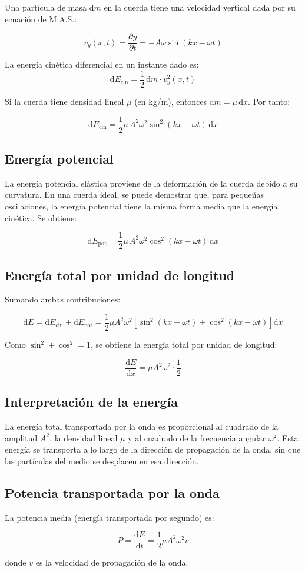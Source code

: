 Una partícula de masa \(\mathrm{d}m\) en la cuerda tiene una velocidad vertical dada por su ecuación de M.A.S.:

\[
v_y(x,t) = \frac{\partial y}{\partial t} = -A \omega \sin(kx - \omega t)
\]

La energía cinética diferencial en un instante dado es:
\[
\mathrm{d}E_{\text{cin}} = \frac{1}{2} \, \mathrm{d}m \cdot v_y^2(x,t)
\]

Si la cuerda tiene densidad lineal \(\mu\) (en kg/m), entonces \(\mathrm{d}m = \mu \, \mathrm{d}x\). Por tanto:

\[
\mathrm{d}E_{\text{cin}} = \frac{1}{2} \mu \, A^2 \omega^2 \sin^2(kx - \omega t) \, \mathrm{d}x
\]

\subsection{Energía potencial}

La energía potencial elástica proviene de la deformación de la cuerda debido a su curvatura. En una cuerda ideal, se puede demostrar que, para pequeñas oscilaciones, la energía potencial tiene la misma forma media que la energía cinética. Se obtiene:

\[
\mathrm{d}E_{\text{pot}} = \frac{1}{2} \mu \, A^2 \omega^2 \cos^2(kx - \omega t) \, \mathrm{d}x
\]

\subsection{Energía total por unidad de longitud}

Sumando ambas contribuciones:

\[
\mathrm{d}E = \mathrm{d}E_{\text{cin}} + \mathrm{d}E_{\text{pot}} = \frac{1}{2} \mu A^2 \omega^2 \left[ \sin^2(kx - \omega t) + \cos^2(kx - \omega t) \right] \mathrm{d}x
\]

Como \(\sin^2 + \cos^2 = 1\), se obtiene la energía total por unidad de longitud:

\[
\frac{\mathrm{d}E}{\mathrm{d}x} = \mu A^2 \omega^2 \cdot \frac{1}{2}
\]


\subsection{Interpretación de la energía}

La energía total transportada por la onda es proporcional al cuadrado de la amplitud \(A^2\), la densidad lineal \(\mu\) y al cuadrado de la frecuencia angular \(\omega^2\). Esta energía se transporta a lo largo de la dirección de propagación de la onda, sin que las partículas del medio se desplacen en esa dirección.

\subsection{Potencia transportada por la onda}

La potencia media (energía transportada por segundo) es:

\[
P = \frac{\mathrm{d}E}{\mathrm{d}t} = \frac{1}{2} \mu A^2 \omega^2 v
\]

donde \(v\) es la velocidad de propagación de la onda.
